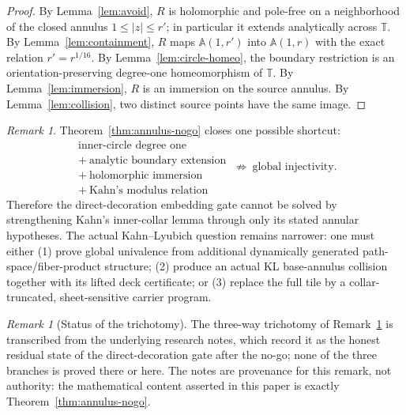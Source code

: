 \documentclass[11pt,reqno]{amsart}
\theoremstyle{definition}
\theoremstyle{remark}
\newtheorem{remark}[theorem]{Remark}
\begin{document}
\begin{proof}
By Lemma~\ref{lem:avoid}, \(R\) is holomorphic and pole-free on a neighborhood of the closed annulus \(1\le|z|\le r'\); in particular it extends analytically across \(\mathbb T\). By Lemma~\ref{lem:containment}, \(R\) maps \(\mathbb A(1,r')\) into \(\mathbb A(1,r)\) with the exact relation \(r'=r^{1/16}\). By Lemma~\ref{lem:circle-homeo}, the boundary restriction is an orientation-preserving degree-one homeomorphism of \(\mathbb T\). By Lemma~\ref{lem:immersion}, \(R\) is an immersion on the source annulus. By Lemma~\ref{lem:collision}, two distinct source points have the same image. 
\end{proof}
\begin{remark}\label{rem:annulus-gate}
Theorem~\ref{thm:annulus-nogo} closes one possible shortcut:
\[ \boxed{\ \begin{array}{c}\text{inner-circle degree one}\\ +\ \text{analytic boundary extension}\\ +\ \text{holomorphic immersion}\\ +\ \text{Kahn's modulus relation}\end{array}\ \not\Longrightarrow\ \text{global injectivity}.\ } \]
Therefore the direct-decoration embedding gate cannot be solved by strengthening Kahn's inner-collar lemma through only its stated annular hypotheses. The actual Kahn--Lyubich question remains narrower: one must either (1) prove global univalence from additional dynamically generated path-space/fiber-product structure; (2) produce an actual KL base-annulus collision together with its lifted deck certificate; or (3) replace the full tile by a collar-truncated, sheet-sensitive carrier program.
\end{remark}

\begin{remark}[Status of the trichotomy]\label{rem:annulus-gate-status}
The three-way trichotomy of Remark~\ref{rem:annulus-gate} is transcribed
from the underlying research notes, which record it as the honest
residual state of the direct-decoration gate after the no-go; none of
the three branches is proved there or here.  The notes are provenance
for this remark, not authority: the mathematical content asserted in
this paper is exactly Theorem~\ref{thm:annulus-nogo}.
\end{remark}
\end{document}

